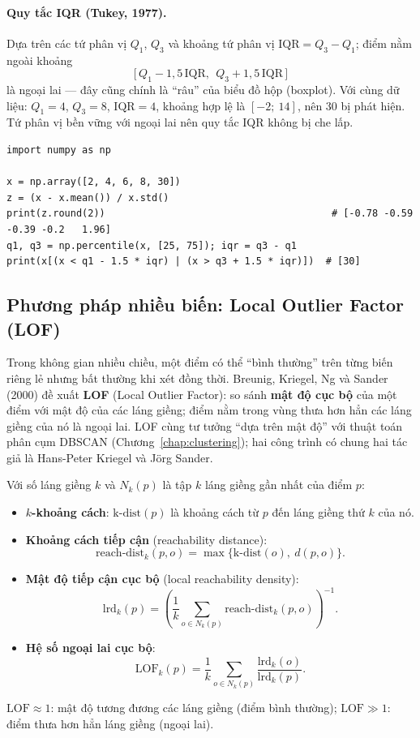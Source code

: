 \paragraph{Quy tắc IQR (Tukey, 1977).} Dựa trên các tứ phân vị $Q_1$, $Q_3$ và khoảng tứ phân vị $\mathrm{IQR} = Q_3 - Q_1$; điểm nằm ngoài khoảng
\begin{equation}
    \big[\,Q_1 - 1{,}5\,\mathrm{IQR},\ \ Q_3 + 1{,}5\,\mathrm{IQR}\,\big]
\end{equation}
là ngoại lai --- đây cũng chính là ``râu'' của biểu đồ hộp (boxplot). Với cùng dữ liệu: $Q_1 = 4$, $Q_3 = 8$, $\mathrm{IQR} = 4$, khoảng hợp lệ là $[-2;\ 14]$, nên 30 bị phát hiện. Tứ phân vị bền vững với ngoại lai nên quy tắc IQR không bị che lấp.

\begin{lstlisting}[caption={z-score và quy tắc IQR}]
import numpy as np

x = np.array([2, 4, 6, 8, 30])
z = (x - x.mean()) / x.std()
print(z.round(2))                                       # [-0.78 -0.59 -0.39 -0.2   1.96]
q1, q3 = np.percentile(x, [25, 75]); iqr = q3 - q1
print(x[(x < q1 - 1.5 * iqr) | (x > q3 + 1.5 * iqr)])  # [30]
\end{lstlisting}

\subsection{Phương pháp nhiều biến: Local Outlier Factor (LOF)}

Trong không gian nhiều chiều, một điểm có thể ``bình thường'' trên từng biến riêng lẻ nhưng bất thường khi xét đồng thời. Breunig, Kriegel, Ng và Sander (2000) đề xuất \textbf{LOF} (Local Outlier Factor): so sánh \textbf{mật độ cục bộ} của một điểm với mật độ của các láng giềng; điểm nằm trong vùng thưa hơn hẳn các láng giềng của nó là ngoại lai. LOF cùng tư tưởng ``dựa trên mật độ'' với thuật toán phân cụm DBSCAN (Chương~\ref{chap:clustering}); hai công trình có chung hai tác giả là Hans-Peter Kriegel và Jörg Sander.

\begin{definition}
Với số láng giềng $k$ và $N_k(p)$ là tập $k$ láng giềng gần nhất của điểm $p$:
\begin{itemize}
    \item \textbf{$k$-khoảng cách}: $\text{k-dist}(p)$ là khoảng cách từ $p$ đến láng giềng thứ $k$ của nó.
    \item \textbf{Khoảng cách tiếp cận} (reachability distance):
    \[ \text{reach-dist}_k(p, o) = \max\{\text{k-dist}(o),\ d(p, o)\}. \]
    \item \textbf{Mật độ tiếp cận cục bộ} (local reachability density):
    \[ \text{lrd}_k(p) = \left(\frac{1}{k}\sum_{o \in N_k(p)} \text{reach-dist}_k(p, o)\right)^{-1}. \]
    \item \textbf{Hệ số ngoại lai cục bộ}:
    \[ \text{LOF}_k(p) = \frac{1}{k}\sum_{o \in N_k(p)} \frac{\text{lrd}_k(o)}{\text{lrd}_k(p)}. \]
\end{itemize}
$\text{LOF} \approx 1$: mật độ tương đương các láng giềng (điểm bình thường); $\text{LOF} \gg 1$: điểm thưa hơn hẳn láng giềng (ngoại lai).
\end{definition}

